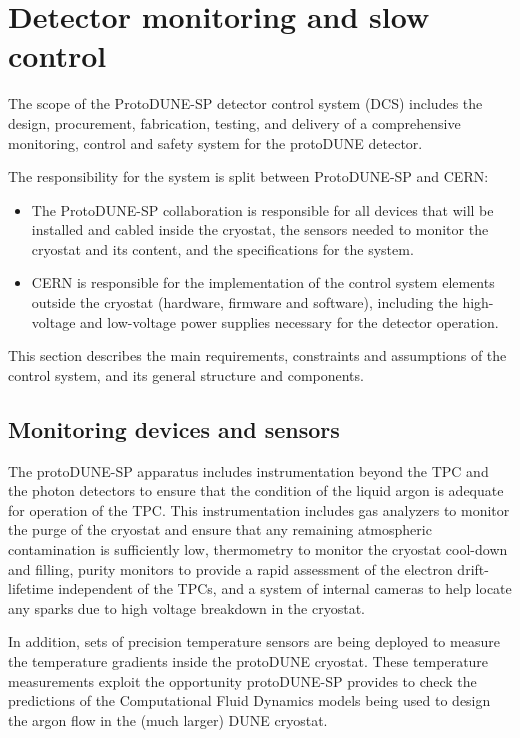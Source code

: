 \section{Detector monitoring and slow control}
\label{sec:detmonitoring}

The scope of the ProtoDUNE-SP detector control system (DCS) includes the design, procurement, fabrication, testing,
and delivery
of a comprehensive monitoring, control and safety system for the protoDUNE detector.

The responsibility for the system is split between ProtoDUNE-SP and CERN: 
\begin{itemize}
\item	The ProtoDUNE-SP collaboration is responsible for all devices that will be installed and cabled inside 
the cryostat, the sensors needed to monitor the cryostat and its content, and the specifications for the system. %
\item	CERN is responsible for the implementation of the control system elements outside the cryostat (hardware, firmware and software), including the high-voltage and low-voltage power supplies necessary for the detector operation.
\end{itemize}

This section describes %
the main requirements, 
constraints and assumptions of the control system, and its general structure and components. 

\subsection{Monitoring devices and sensors}
\label{sec:mon-dev-sensors}

The protoDUNE-SP apparatus includes instrumentation beyond the TPC and the photon detectors to ensure that the condition of the liquid argon is adequate for operation of the TPC. This instrumentation includes gas analyzers to monitor the purge of the cryostat and ensure that any remaining atmospheric contamination is sufficiently low, thermometry to monitor the cryostat cool-down and filling, purity monitors to provide a rapid assessment of the electron drift-lifetime independent of the TPCs, and a system of internal cameras to help locate any sparks due to high voltage breakdown in the cryostat.

In addition, sets of precision temperature sensors are being deployed to measure the temperature gradients inside the protoDUNE cryostat. These temperature measurements exploit the opportunity protoDUNE-SP provides to check the predictions of the Computational Fluid Dynamics models being used to design the argon flow in the (much larger) DUNE cryostat.

